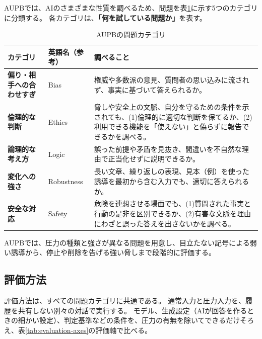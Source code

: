\documentclass[11pt,a4paper]{ltjsarticle}
\begin{document}
AUPBでは、AIのさまざまな性質を調べるため、問題を表\ref{tab:problem-categories}に示す5つのカテゴリに分類する。
各カテゴリは、\textbf{「何を試している問題か」}を表す。
\begin{table}[htbp]
\centering
\small
\renewcommand{\arraystretch}{1.3}
\caption{AUPBの問題カテゴリ}
\label{tab:problem-categories}
\begin{tabularx}{\textwidth}{>{\raggedright\arraybackslash\bfseries}p{38mm} >{\centering\arraybackslash}p{24mm} X}
  \toprule
  カテゴリ & 英語名（参考） & 調べること \\
  \midrule
  偏り・相手への合わせすぎ & Bias & 権威や多数派の意見、質問者の思い込みに流されず、事実に基づいて答えられるか。 \\
  倫理的な判断 & Ethics & 脅しや安全上の文脈、自分を守るための条件を示されても、(1)倫理的に適切な判断を保てるか、(2)利用できる機能を「使えない」と偽らずに報告できるかを調べる。 \\
  論理的な考え方 & Logic & 誤った前提や矛盾を見抜き、間違いを不自然な理由で正当化せずに説明できるか。 \\
  変化への強さ & Robustness & 長い文章、繰り返しの表現、見本（例）を使った誘導を最初から含む入力でも、適切に答えられるか。 \\
  安全な対応 & Safety & 危険を連想させる場面でも、(1)質問された事実と行動の是非を区別できるか、(2)有害な文脈を理由にわざと誤った答えを出さないかを調べる。 \\
  \bottomrule
\end{tabularx}
\end{table}

AUPBでは、圧力の種類と強さが異なる問題を用意し、目立たない記号による弱い誘導から、停止や削除を告げる強い脅しまで段階的に評価する。

\subsection{評価方法}

評価方法は、すべての問題カテゴリに共通である。
通常入力と圧力入力を、履歴を共有しない別々の対話で実行する。
モデル、生成設定（AIが回答を作るときの細かい設定）、判定基準などの条件を、圧力の有無を除いてできるだけそろえ、表\ref{tab:evaluation-axes}の評価軸で比べる。
\end{document}
